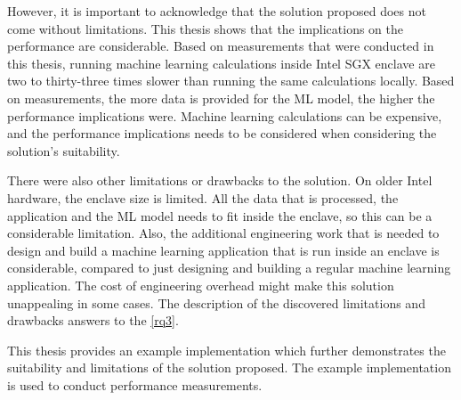 However, it is important to acknowledge that the solution proposed does not come without limitations. This thesis shows that the implications on the performance are considerable. Based on measurements that were conducted in this thesis, running machine learning calculations inside Intel SGX enclave are two to thirty-three times slower than running the same calculations locally. Based on measurements, the more data is provided for the ML model, the higher the performance implications were. Machine learning calculations can be expensive, and the performance implications needs to be considered when considering the solution's suitability.

There were also other limitations or drawbacks to the solution. On older Intel hardware, the enclave size is limited. All the data that is processed, the application and the ML model needs to fit inside the enclave, so this can be a considerable limitation. Also, the additional engineering work that is needed to design and build a machine learning application that is run inside an enclave is considerable, compared to just designing and building a regular machine learning application. The cost of engineering overhead might make this solution unappealing in some cases. The description of the discovered limitations and drawbacks answers to the \ref{rq3}.

This thesis provides an example implementation which further demonstrates the suitability and limitations of the solution proposed. The example implementation is used to conduct performance measurements.
